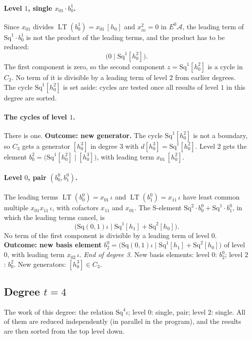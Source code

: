 \documentclass[11pt]{article}
\newcommand{\Sq}{\mathrm{Sq}}
\DeclareMathOperator{\LT}{LT}
\begin{document}
\paragraph{Level $1$, single $x_{01}\cdot b^{1}_{0}$.} Since $x_{01}$ divides $\LT(b^{1}_{0}) = x_{01}\,[h_0]$ and $x_{in}^2 = 0$ in $E^0\mathcal A$, the leading term of $\Sq^{1}\cdot b^{1}_{0}$ is not the product of the leading terms, and the product has to be reduced:
\[\bigl(0 \;\big|\; \Sq^{1}[h_0^2]\bigr).\]
The first component is zero, so the second component $z = \Sq^{1}[h_0^2]$ is a cycle in $C_{2}$.
No term of it is divisible by a leading term of level $2$ from earlier degrees.
The cycle $\Sq^{1}[h_0^2]$ is set aside: cycles are tested once all results of level $1$ in this degree are sorted.
\medskip
\paragraph{The cycles of level $1$.} There is one.
\textbf{Outcome: new generator.} The cycle $\Sq^{1}[h_0^2]$ is not a boundary, so $C_{3}$ gets a generator $[h_0^3]$ in degree $3$ with $d[h_0^3] = \Sq^{1}[h_0^2]$.
Level $2$ gets the element $b^{2}_{0} = \bigl(\Sq^{1}[h_0^2] \;\big|\; [h_0^3]\bigr)$, with leading term $x_{01}\,[h_0^2]$.
\medskip
\paragraph{Level $0$, pair $(b^{0}_{0}, b^{0}_{1})$.} The leading terms $\LT(b^{0}_{0}) = x_{01}\,\iota$ and $\LT(b^{0}_{1}) = x_{11}\,\iota$ have least common multiple $x_{01}x_{11}\,\iota$, with cofactors $x_{11}$ and $x_{01}$. The S-element $\Sq^{2}\cdot b^{0}_{0} + \Sq^{1}\cdot b^{0}_{1}$, in which the leading terms cancel, is
\[\bigl(\Sq(0,1)\iota \;\big|\; \Sq^{1}[h_1] + \Sq^{2}[h_0]\bigr).\]
No term of the first component is divisible by a leading term of level $0$.
\textbf{Outcome: new basis element} $b^{0}_{2} = \bigl(\Sq(0,1)\iota \;\big|\; \Sq^{1}[h_1] + \Sq^{2}[h_0]\bigr)$ of level $0$, with leading term $x_{02}\,\iota$.
\medskip\noindent\emph{End of degree 3.} New basis elements: level $0$: $b^{0}_{2}$; level $2$: $b^{2}_{0}$. New generators: $[h_0^3]\in C_{3}$.
\subsection*{Degree $t = 4$}
\noindent The work of this degree: the relation $\Sq^{4}\iota$; level $0$: single, pair; level $2$: single. All of them are reduced independently (in parallel in the program), and the results are then sorted from the top level down.
\medskip
\end{document}
